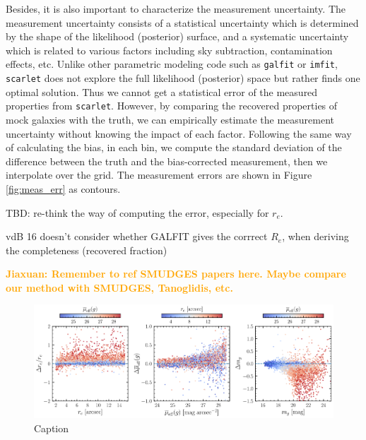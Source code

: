 \documentclass[twocolumn,astrosymb,twocolappendix]{aastex631}
\newcommand{\jiaxuan}[1]{\textcolor{orange}{\textbf{Jiaxuan: #1}}}
\newcommand{\code}[1]{\texttt{#1}}
\begin{document}
\begin{CJK*}{UTF8}{gbsn}
Besides, it is also important to characterize the measurement uncertainty. The measurement uncertainty consists of a statistical uncertainty which is determined by the shape of the likelihood (posterior) surface, and a systematic uncertainty which is related to various factors including sky subtraction, contamination effects, etc. Unlike other parametric modeling code such as \code{galfit} or \code{imfit}, \code{scarlet} does not explore the full likelihood (posterior) space but rather finds one optimal solution. Thus we cannot get a statistical error of the measured properties from \code{scarlet}. However, by comparing the recovered properties of mock galaxies with the truth, we can empirically estimate the measurement uncertainty without knowing the impact of each factor. Following the same way of calculating the bias, in each bin, we compute the standard deviation of the difference between the truth and the bias-corrected measurement, then we interpolate over the grid. The measurement errors are shown in Figure \ref{fig:meas_err} as contours. 



TBD: re-think the way of computing the error, especially for $r_e$. 


vdB 16 doesn't consider whether GALFIT gives the corrrect $R_e$, when deriving the completeness (recovered fraction)

\jiaxuan{Remember to ref SMUDGES papers here. Maybe compare our method with SMUDGES, Tanoglidis, etc.}

\begin{figure}
	\vbox{ 
		\centering
		\includegraphics[width=1\linewidth]{meas_bias.pdf}
	}
    \caption{Caption}
    \label{fig:meas_bias}
\end{figure}



\end{CJK*}
\end{document}
